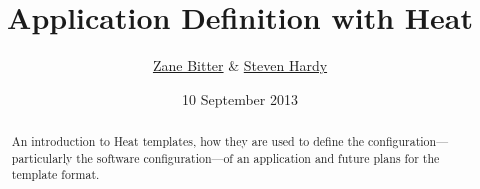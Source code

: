 \documentclass{tufte-handout}
\title{Application Definition with Heat}
\author{\href{mailto:zbitter@redhat.com}{Zane Bitter} \& \href{mailto:shardy@redhat.com}{Steven Hardy}}
\date{10 September 2013}
\begin{document}
\maketitle

\marginnote{\tableofcontents \vspace{2em}}

\begin{abstract}
An introduction to Heat templates, how they are used to define the configuration---particularly the software configuration---of an application and future plans for the template format.
\end{abstract}












\end{document}
